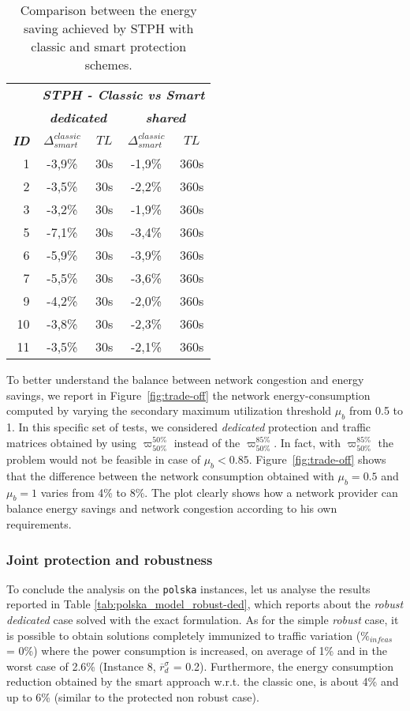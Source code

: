 \documentclass[final,5p,times,twocolumn]{elsarticle}
\begin{document}
\begin{table}[!htbp]
\centering
\scriptsize
\tabcolsep 6pt
\begin{tabular}{rcccc}
& \multicolumn{4}{c}{\textbf{\textit{STPH - Classic vs Smart }}} \\
\cline{2-5}
& \multicolumn{2}{c}{\textbf{\textit{dedicated}}} & \multicolumn{2}{c}{\textbf{\textit{shared}}}  \\ 
\hline
\textbf{\textit{ID}} & $\Delta_{smart}^{classic}$ & \textbf{\textit{$TL$}} & $\Delta_{smart}^{classic}$ & \textbf{\textit{$TL$}} \\ 
\hline
1 & -3,9\% & 30s &-1,9\%  &360s\\
2 & -3,5\% & 30s &-2,2\%  &360s\\ 
3 & -3,2\% & 30s &-1,9\%  &360s\\
5 & -7,1\% & 30s &-3,4\%  &360s\\
6 & -5,9\% & 30s &-3,9\%  &360s\\
7 & -5,5\% & 30s &-3,6\%  &360s\\
9 & -4,2\% & 30s &-2,0\%  &360s\\
10& -3,8\% & 30s &-2,3\%  &360s\\
11& -3,5\% & 30s &-2,1\%  &360s\\
\end{tabular}
\caption{Comparison between the energy saving achieved by STPH with classic and smart protection schemes.}
\label{tab:polska_STPH_smart_vs_classic}
\end{table}

To better understand the balance between network congestion and energy savings, we report in Figure~\ref{fig:trade-off} the network energy-consumption computed by varying the secondary maximum utilization threshold $\mu_b$ from 0.5 to 1. In this specific set of tests, we considered \textit{dedicated} protection and traffic matrices obtained by using $\varpi_{50\%}^{50\%}$ instead of the $\varpi_{50\%}^{85\%}$. In fact, with $\varpi_{50\%}^{85\%}$ the problem would not be feasible in case of $\mu_b < 0.85$. Figure~\ref{fig:trade-off} shows that the difference between the network consumption obtained with $\mu_b = 0.5$ and $\mu_b = 1$ varies from 4\% to 8\%. The plot clearly shows how a network provider can balance energy savings and network congestion according to his own requirements. 

\subsubsection{Joint protection and robustness}
To conclude the analysis on the {\tt polska} instances, let us analyse the results reported in Table \ref{tab:polska_model_robust-ded}, which reports about the \textit{robust dedicated} case solved with the exact formulation. As for the simple \textit{robust} case, it is possible to obtain solutions completely immunized to traffic variation ($\%_{infeas}$ = 0\%) where the power consumption is increased, on average of 1\% and in the worst case of 2.6\% (Instance 8, $\overline{r}_d^{\sigma}$ = 0.2). Furthermore, the  energy consumption reduction obtained by the smart approach w.r.t. the classic one, is about 4\% and up to 6\% (similar to the protected non robust case). 
\end{document}
